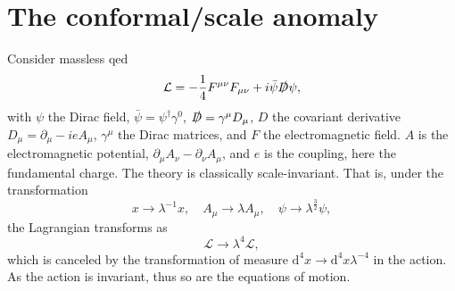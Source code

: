 \section{The conformal/scale anomaly}
Consider massless \gls{qed}
\begin{equation}
  \mathcal{L} = -\frac{1}{4} F^{\mu\nu}F_{\mu\nu} + i \bar{\psi} \slashed{D} \psi,
\end{equation}
with $\psi$ the Dirac field, $\bar{\psi} = \psi^{\dagger}\gamma^0$, $\slashed{D} = \gamma^{\mu} D_{\mu}$, $D$ the covariant derivative $D_{\mu} = \partial_{\mu}-ieA_{\mu}$, $\gamma^{\mu}$ the Dirac matrices, and $F$ the electromagnetic field.
$A$ is the electromagnetic potential, $\partial _{\mu }A_{\nu } - \partial _{\nu } A_{\mu }$, and $e$ is the coupling, here the fundamental charge.
The theory is classically scale-invariant.
That is, under the transformation
\begin{equation}
  x \to \lambda^{-1} x, \quad A_{\mu} \to  \lambda A_{\mu}, \quad \psi \to  \lambda^{\frac{3}{2}}\psi,
\end{equation}
the Lagrangian transforms as
\begin{equation}
  \mathcal{L} \to \lambda^4 \mathcal{L},
\end{equation}
which is canceled by the transformation of measure $\mathrm{d}^4 x \to \mathrm{d}^4x \lambda ^{-4}$ in the action.
As the action is invariant, thus so are the equations of motion.

